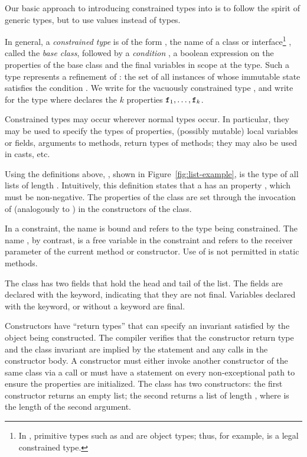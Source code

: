 Our basic approach to introducing constrained types into \Xten{}
is to follow the spirit of generic types, but to use values
instead of types.

In general, a {\em constrained type} is of the form ,
the name of a class or interface\footnote{In \Xten{}, primitive
types such as  and  are object types; thus,
for example,  is a legal constrained type.}
, called the {\em base class}, followed
by a {\em condition} ,
a boolean expression on the properties of the
base class and the final variables in scope at the type.
Such a type represents a refinement of : the set of all
instances of  whose immutable state satisfies the
condition .
%
We write  for 
the vacuously constrained type , and
write
 for
the type
where  declares the $k$ properties
${\tt f}_1,\ldots,{\tt f}_k$.

Constrained types may occur wherever normal types occur. In
particular, they may be used to specify the types of properties,
(possibly mutable) local variables or fields,
arguments to methods, return types of methods; they may also be
used in casts, etc.

Using the definitions above, , shown in
Figure~\ref{fig:list-example}, is the type of all lists of
length .
%
Intuitively, this definition states that a  has an 
property , which must be non-negative.
The properties
of the
class are set through the invocation of \tcd{(\ldots)}
(analogously to \tcd{(\ldots)}) in the constructors
of the class.

In a constraint, the name  is bound and refers to the type being
constrained.  The name , by contrast, is a free
variable in the
constraint and refers to the receiver parameter of the current
method or constructor.  Use of  is not permitted in static
methods.

The  class has two
fields that hold the head and tail of the list.  The fields are
declared with the  keyword, indicating that they are
not final.  Variables declared with the  keyword, or
without a keyword are final.

Constructors have ``return
types'' that can specify an invariant satisfied by the object being
constructed.  The compiler verifies that the
constructor return type and the class invariant are implied by the
 statement and any  calls in the constructor
body.
A constructor must either invoke another constructor of the same
class via a
 call
or must have a  statement on every
non-exceptional path
to ensure the properties are initialized.
The  class has two constructors: the first
constructor returns an empty list;
the second
returns a list of length , where  is the length
of the second argument. 

